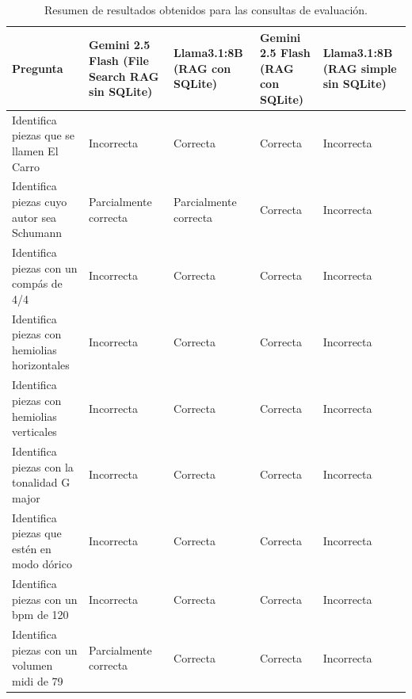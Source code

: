 \setlength\LTleft{-1cm}
\setlength\LTright{0pt}
\begin{longtable}{|m{5cm}|m{2.5cm}|m{2.5cm}|m{2.5cm}|m{2.5cm}|}
\caption{Resumen de resultados obtenidos para las consultas de evaluación.}
\label{tab:evaluacion_modelos} \\

\hline
\textbf{Pregunta} &
\textbf{Gemini 2.5 Flash (File Search RAG sin SQLite)} &
\textbf{Llama3.1:8B (RAG con SQLite)} &
\textbf{Gemini 2.5 Flash (RAG con SQLite)} &
\textbf{Llama3.1:8B (RAG simple sin SQLite)} \\
\hline
\endfirsthead

\hline

Identifica piezas que se llamen El Carro &
Incorrecta &
Correcta &
Correcta &
Incorrecta \\

\hline

Identifica piezas cuyo autor sea Schumann &
Parcialmente correcta &
Parcialmente correcta &
Correcta &
Incorrecta \\

\hline

Identifica piezas con un compás de 4/4 &
Incorrecta &
Correcta &
Correcta &
Incorrecta \\

\hline

Identifica piezas con hemiolias horizontales &
Incorrecta &
Correcta &
Correcta &
Incorrecta \\

\hline

Identifica piezas con hemiolias verticales &
Incorrecta &
Correcta &
Correcta &
Incorrecta \\

\hline

Identifica piezas con la tonalidad G major &
Incorrecta &
Correcta &
Correcta &
Incorrecta \\

\hline

Identifica piezas que estén en modo dórico &
Incorrecta &
Correcta &
Correcta &
Incorrecta \\

\hline

Identifica piezas con un bpm de 120 &
Incorrecta &
Correcta &
Correcta &
Incorrecta \\

\hline

Identifica piezas con un volumen midi de 79 &
Parcialmente correcta &
Correcta &
Correcta &
Incorrecta \\


\end{longtable}
